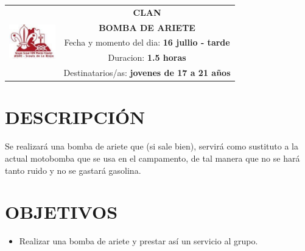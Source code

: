 \documentclass[10pt]{article}
\newlength{\w}
\begin{document}
\large
{}\selectfont
\begin{tabular}{|p{2cm}|c|}
\hline
\multirow{5}{*}{\includegraphics[width=2cm]{logo}} & \textbf{CLAN} \\
\cline{2-2}
& \textbf{BOMBA DE ARIETE} \\
\cline{2-2}
& \parbox{\textwidth-4cm}{Fecha y momento del dia: \textbf{16 jullio - tarde}} \\ %
& \parbox{\textwidth-4cm}{Duracion: \textbf{1.5 horas}} \\ %
& \parbox{\textwidth-4cm}{Destinatarios/as: \textbf{jovenes de 17 a 21 años}} \\ %
\hline
\end{tabular}

\section*{DESCRIPCI\'ON}
Se realizar\'a una bomba de ariete que (si sale bien), servir\'a como sustituto a la actual
motobomba que se usa en el campamento, de tal manera que no se har\'a tanto ruido
y no se gastar\'a gasolina.

\section{OBJETIVOS}
\begin{itemize}
\item Realizar una bomba de ariete y prestar as\'i un servicio al grupo.
\end{itemize}
\end{document}
